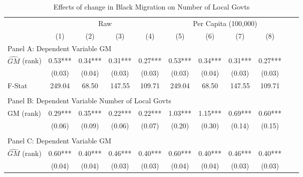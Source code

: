  \begin{table}[htbp]\centering {} \begin{threeparttable} \caption{Effects of change in Black Migration on Number of Local Govts} \begin{tabular}{l*{10}{c}} \toprule
                &\multicolumn{4}{c}{Raw}                                    &\multicolumn{4}{c}{Per Capita (100,000)}                   \\\cmidrule(lr){2-5}\cmidrule(lr){6-9}
                &\multicolumn{1}{c}{(1)}   &\multicolumn{1}{c}{(2)}   &\multicolumn{1}{c}{(3)}   &\multicolumn{1}{c}{(4)}   &\multicolumn{1}{c}{(5)}   &\multicolumn{1}{c}{(6)}   &\multicolumn{1}{c}{(7)}   &\multicolumn{1}{c}{(8)}   \\
\cmidrule(lr){1-9}
\multicolumn{8}{l}{Panel A: Dependent Variable GM}\\
\cmidrule(lr){1-9}
$\hat{GM}$ (rank)&       0.53***&       0.34***&       0.31***&       0.27***&       0.53***&       0.34***&       0.31***&       0.27***\\
                &     (0.03)   &     (0.04)   &     (0.03)   &     (0.03)   &     (0.03)   &     (0.04)   &     (0.03)   &     (0.03)   \\
\midrule
F-Stat          &     249.04   &      68.50   &     147.55   &     109.71   &     249.04   &      68.50   &     147.55   &     109.71   \\
\cmidrule[\heavyrulewidth](lr){1-9} \\ \cmidrule[\heavyrulewidth](lr){1-9}
\multicolumn{8}{l}{Panel B: Dependent Variable Number of Local Govts}\\
\cmidrule(lr){1-9}
GM  (rank)      &       0.29***&       0.35***&       0.22***&       0.22***&       1.03***&       1.15***&       0.69***&       0.60***\\
                &     (0.06)   &     (0.09)   &     (0.06)   &     (0.07)   &     (0.20)   &     (0.30)   &     (0.14)   &     (0.15)   \\
\cmidrule[\heavyrulewidth](lr){1-9} \\ \cmidrule[\heavyrulewidth](lr){1-9}
\multicolumn{8}{l}{Panel C: Dependent Variable GM}\\
\cmidrule(lr){1-9}
$\hat{GM}$ (rank)&       0.60***&       0.40***&       0.46***&       0.40***&       0.60***&       0.40***&       0.46***&       0.40***\\
                &     (0.04)   &     (0.04)   &     (0.03)   &     (0.03)   &     (0.04)   &     (0.04)   &     (0.03)   &     (0.03)   \\

\end{tabular}
\end{threeparttable}
\end{table}
